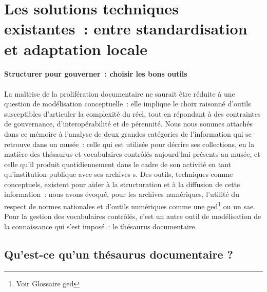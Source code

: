 \section{\label{III-A-2}Les solutions techniques existantes~: entre standardisation et adaptation locale}

\paragraph*{Structurer pour gouverner~: choisir les bons outils}
La maîtrise de la prolifération documentaire ne saurait être réduite à une question de modélisation conceptuelle~: elle implique le choix raisonné d’outils susceptibles d’articuler la complexité du réel, tout en répondant à des contraintes de gouvernance, d’interopérabilité et de pérennité. Nous nous sommes attachés dans ce mémoire à l'analyse de deux grandes catégories de l'information qui se retrouve dans un musée~: celle qui est utilisée pour décrire ses collections, en la matière des thésaurus et vocabulaires contrôlés aujourd'hui présents au musée, et celle qu'il produit quotidiennement dans le cadre de son activité en tant qu'institution publique avec ses archives s. Des outils, techniques comme conceptuels, existent pour aider à la structuration et à la diffusion de cette information~: nous avons évoqué, pour les archives numériques, l'utilité du respect de normes nationales et d'outils numériques comme une \gls{ged}\footnote{Voir Glossaire \gls{ged}} ou un \gls{sae}. Pour la gestion des vocabulaires contrôlés, c'est un autre outil de modélisation de la connaissance qui s'est imposé~: le thésaurus documentaire.

\subsection{\label{III-A-2.1}Qu’est-ce qu’un thésaurus documentaire ?}


